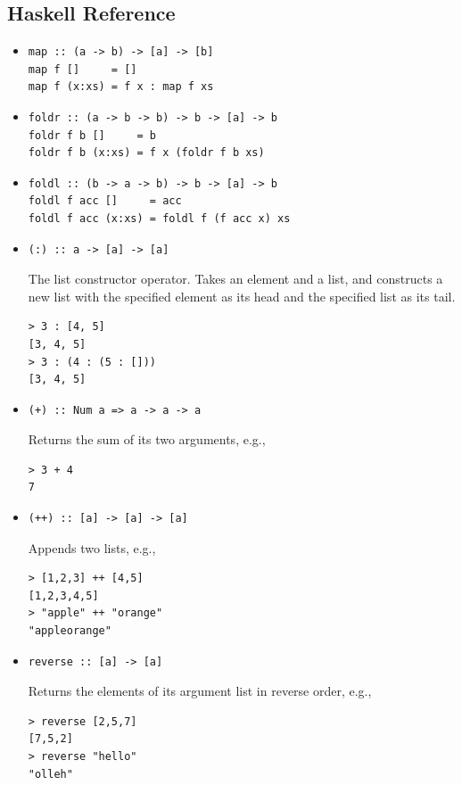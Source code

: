 \documentclass[addpoints]{exam}
\begin{document}
\newpage

\subsection*{Haskell Reference}

\begin{itemize}

\item
\begin{verbatim}
map :: (a -> b) -> [a] -> [b]
map f []     = []
map f (x:xs) = f x : map f xs
\end{verbatim}
\item
\begin{verbatim}
foldr :: (a -> b -> b) -> b -> [a] -> b
foldr f b []     = b
foldr f b (x:xs) = f x (foldr f b xs)
\end{verbatim}
\item
\begin{verbatim}
foldl :: (b -> a -> b) -> b -> [a] -> b
foldl f acc []     = acc
foldl f acc (x:xs) = foldl f (f acc x) xs
\end{verbatim}
\item
\begin{verbatim}
(:) :: a -> [a] -> [a]
\end{verbatim}
The list constructor operator.  Takes an element and a list, and constructs a new list with the specified element as its head and the specified list as its tail.
\begin{verbatim}
> 3 : [4, 5]
[3, 4, 5]
> 3 : (4 : (5 : []))
[3, 4, 5]
\end{verbatim}
\item
\begin{verbatim}
(+) :: Num a => a -> a -> a
\end{verbatim}
Returns the sum of its two arguments, e.g.,
\begin{verbatim}
> 3 + 4
7
\end{verbatim}
\item
\begin{verbatim}
(++) :: [a] -> [a] -> [a]
\end{verbatim}
Appends two lists, e.g.,
\begin{verbatim}
> [1,2,3] ++ [4,5]
[1,2,3,4,5]
> "apple" ++ "orange"
"appleorange"
\end{verbatim}
\item
\begin{verbatim}
reverse :: [a] -> [a]
\end{verbatim}
Returns the elements of its argument list in reverse order, e.g.,
\begin{verbatim}
> reverse [2,5,7]
[7,5,2]
> reverse "hello"
"olleh"
\end{verbatim}


\end{itemize}
\end{document}
